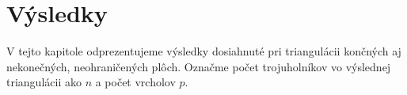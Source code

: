 \newcommand{\ApplyGradientH}[1]{%
  \iftoggle{inTableHeader}{#1}{
    \ifdim #1 pt > \MidNumberH pt
        \pgfmathsetmacro{\PercentColor}{max(min(100.0*(#1 - \MidNumberH)/(\MaxNumberH-\MidNumberH),100.0),0.00)} %
        \colorbox{green!\PercentColor!yellow}{#1}
    \else
        \pgfmathsetmacro{\PercentColor}{max(min(100.0*(\MidNumberH - #1)/(\MidNumberH-\MinNumberH),100.0),0.00)} %
        \colorbox{red!\PercentColor!yellow}{#1}
    \fi
  }
  }




\renewcommand{\arraystretch}{1}
\setlength{\fboxsep}{2mm} %
\setlength{\tabcolsep}{-4pt}

\chapter{Výsledky}
\label{kap:results}

V tejto kapitole odprezentujeme výsledky dosiahnuté pri triangulácii končných aj 
nekonečných, neohraničených plôch. Označme počet trojuholníkov vo výslednej triangulácii 
ako $n$ a počet vrcholov $p$.

